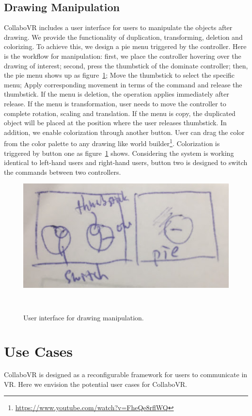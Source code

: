 \documentclass{sigchi}
\begin{document}
\subsection{Drawing Manipulation}
CollaboVR includes a user interface for users to manipulate the objects after drawing. We provide the functionality of duplication, transforming, deletion and colorizing. To achieve this, we design a pie menu triggered by the controller. Here is the workflow for manipulation: first, we place the controller hovering over the drawing of interest; second, press the thumbstick of the dominate controller; then, the pie menu shows up as figure~\ref{fig:userinterface}; Move the thumbstick to select the specific menu; Apply corresponding movement in terms of the command and release the thumbstick. If the menu is deletion, the operation applies immediately after release. If the menu is transformation, user needs to move the controller to complete rotation, scaling and translation. If the menu is copy, the duplicated object will be placed at the position where the user releases thumbstick. In addition, we enable colorization through another button. User can drag the color from the color palette to any drawing like world builder\footnote{\url{https://www.youtube.com/watch?v=FheQe8rflWQ}}. Colorization is triggered by button one as figure~\ref{fig:userinterface} shows. Considering the system is working identical to left-hand users and right-hand users, button two is designed to switch the commands between two controllers.

\begin{figure}[tb!]
 \centering
 \includegraphics[width=0.9\columnwidth]{userinterface.jpg}
 \caption{User interface for drawing manipulation.
 }~\label{fig:userinterface}
\end{figure}

\section{Use Cases}
CollaboVR is designed as a reconfigurable framework for users to communicate in VR. Here we envision the potential user cases for CollaboVR.
\end{document}
